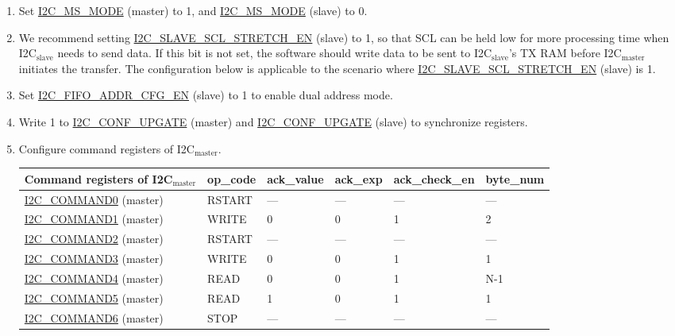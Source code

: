 \documentclass[main\_\_EN.tex]{subfiles}
\begin{document}
\begin{enumerate}
\item Set \hyperref[fielddesc:I2CMSMODE]{I2C\_MS\_MODE} (master) to 1, and \hyperref[fielddesc:I2CMSMODE]{I2C\_MS\_MODE} (slave) to 0.
\item We recommend setting \hyperref[fielddesc:I2CSLAVESCLSTRETCHEN]{I2C\_SLAVE\_SCL\_STRETCH\_EN} (slave) to 1, so that SCL can be held low for more processing time when I2C$_\text{slave}$ needs to send data. If this bit is not set, the software should write data to be sent to I2C$_\text{slave}$'s TX RAM before I2C$_\text{master}$ initiates the transfer. The configuration below is applicable to the scenario where \hyperref[fielddesc:I2CSLAVESCLSTRETCHEN]{I2C\_SLAVE\_SCL\_STRETCH\_EN} (slave) is 1.
\item  Set \hyperref[fielddesc:I2CFIFOADDRCFGEN]{I2C\_FIFO\_ADDR\_CFG\_EN} (slave) to 1 to enable dual address mode.
\item Write 1 to \hyperref[fielddesc:I2CCONFUPGATE]{I2C\_CONF\_UPGATE} (master) and \hyperref[fielddesc:I2CCONFUPGATE]{I2C\_CONF\_UPGATE} (slave) to synchronize registers.
\item Configure command registers of I2C$_\text{master}$.

\begin{longtable}{ | p{5cm} | p{1.5cm} | p{1.5cm} | p{1.5cm} |p{2.5cm} | p{1.5cm} |}
\hline\rowcolor{lightgray}
Command registers of I2C$_\text{master}$& op\_code & ack\_value&ack\_exp&ack\_check\_en&byte\_num  \\ \hline
\hyperref[fielddesc:I2CCOMMAND0]{I2C\_COMMAND0} (master)& RSTART& ---&---&---&---  \\ \hline
\hyperref[fielddesc:I2CCOMMAND1]{I2C\_COMMAND1} (master)& WRITE& 0&0&1&2  \\ \hline
\hyperref[fielddesc:I2CCOMMAND2]{I2C\_COMMAND2} (master)& RSTART& ---&---&---&---  \\ \hline
\hyperref[fielddesc:I2CCOMMAND3]{I2C\_COMMAND3} (master)& WRITE& 0&0&1&1  \\ \hline
\hyperref[fielddesc:I2CCOMMAND4]{I2C\_COMMAND4} (master)& READ& 0&0&1&N-1  \\ \hline
\hyperref[fielddesc:I2CCOMMAND5]{I2C\_COMMAND5} (master)& READ& 1&0&1&1  \\ \hline
\hyperref[fielddesc:I2CCOMMAND6]{I2C\_COMMAND6} (master)& STOP& ---&---&---&---  \\ \hline
\end{longtable}


\end{enumerate}
\end{document}
